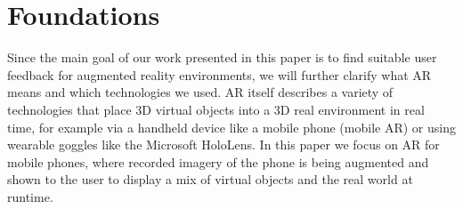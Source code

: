\documentclass[11pt, a4paper]{article}
\begin{document}
	\pagestyle{myheadings}
	\section*{Foundations}\label{sec:foundations}
		Since the main goal of our work presented in this paper is to find suitable user feedback for augmented reality environments, we will further clarify what \ac{AR} means and which technologies we used. \ac{AR} itself describes a variety of technologies that place 3D virtual objects into a 3D real environment in real time, for example via a handheld device like a mobile phone (mobile \ac{AR}) or using wearable goggles like the Microsoft HoloLens. In this paper we focus on \ac{AR} for mobile phones, where recorded imagery of the phone is being augmented and shown to the user to display a mix of virtual objects and the real world at runtime.
\end{document}
